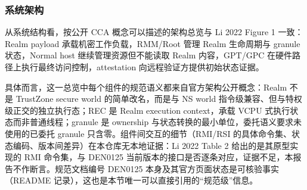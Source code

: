\documentclass[11pt]{ctexart}
\begin{document}
\subsubsection{系统架构}
从系统结构看，按公开 CCA 概念可以描述的架构总览与 Li 2022 Figure 1 一致：Realm payload 承载机密工作负载，RMM/Root 管理 Realm 生命周期与 granule 状态，Normal host 继续管理资源但不能读取 Realm 内容，GPT/GPC 在硬件路径上执行最终访问控制，attestation 向远程验证方提供初始状态证据。\par
具体而言，这一总览中每个组件的规范语义都来自官方架构公开概念：Realm 不是 TrustZone secure world 的简单改名，而是与 NS world 指令级兼容、但与特权级正交的独立执行态；REC 是 Realm execution context，承载 VCPU 式执行状态而非普通线程；granule 是 ownership 与状态转换的最小单位，委托语义要求未使用的已委托 granule 只含零。组件间交互的细节（RMI/RSI 的具体命令集、状态编码、版本间差异）在本仓库无本地证据：Li 2022 Table 2 给出的是其原型实现的 RMI 命令集，与 DEN0125 当前版本的接口是否逐条对应，证据不足，本报告不作断言。规范文档编号 DEN0125 本身及其官方页面状态是可核验事实（README 记录），这也是本节唯一可以直接引用的“规范级”信息。\par
\end{document}
